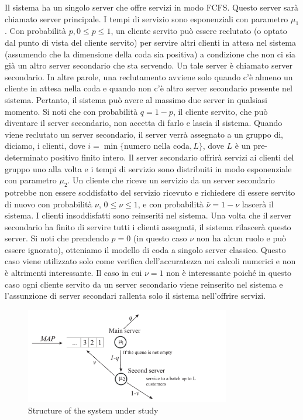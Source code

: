 \documentclass[11pt]{article}
\begin{document}
\noindent Il sistema ha un singolo server che offre servizi in modo FCFS. Questo server sarà chiamato server principale. I tempi di servizio sono esponenziali con parametro $\mu_1$. Con probabilità $p, 0 \leq p \leq 1$, un cliente servito può essere reclutato (o optato dal punto di vista del cliente servito) per servire altri clienti in attesa nel sistema (assumendo che la dimensione della coda sia positiva) a condizione che non ci sia già un altro server secondario che sta servendo. Un tale server è chiamato server secondario. In altre parole, una reclutamento avviene solo quando c'è almeno un cliente in attesa nella coda e quando non c'è altro server secondario presente nel sistema. Pertanto, il sistema può avere al massimo due server in qualsiasi momento. Si noti che con probabilità $q = 1 - p$, il cliente servito, che può diventare il server secondario, non accetta di farlo e lascia il sistema. Quando viene reclutato un server secondario, il server verrà assegnato a un gruppo di, diciamo, i clienti, dove $i = \min \{\text{numero nella coda}, L\}$, dove $L$ è un pre-determinato positivo finito intero. Il server secondario offrirà servizi ai clienti del gruppo uno alla volta e i tempi di servizio sono distribuiti in modo esponenziale con parametro $\mu_2$. Un cliente che riceve un servizio da un server secondario potrebbe non essere soddisfatto del servizio ricevuto e richiedere di essere servito di nuovo con probabilità $\nu$, $0 \leq \nu \leq 1$, e con probabilità $\bar \nu = 1 - \nu$ lascerà il sistema. I clienti insoddisfatti sono reinseriti nel sistema. Una volta che il server secondario ha finito di servire tutti i clienti assegnati, il sistema rilascerà questo server.
Si noti che prendendo $p = 0$ (in questo caso $\nu$ non ha alcun ruolo e può essere ignorato), otteniamo il modello di coda a singolo server classico. Questo caso viene utilizzato solo come verifica dell'accuratezza nei calcoli numerici e non è altrimenti interessante. Il caso in cui $\nu = 1$ non è interessante poiché in questo caso ogni cliente servito da un server secondario viene reinserito nel sistema e l'assunzione di server secondari rallenta solo il sistema nell'offrire servizi.

\begin{figure}[h]
    \centering
    \includegraphics[width=0.8\textwidth]{hVQg024.png}
    \caption{Structure of the system under study}
    \label{fig:diagramma_di_stato}
\end{figure}
\end{document}
